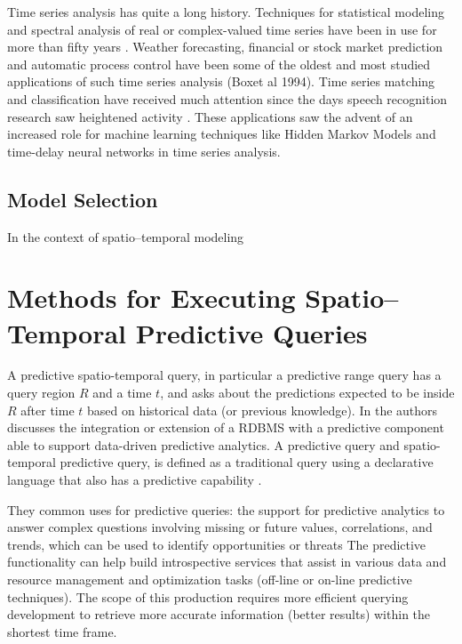 Time series analysis has quite a long history. Techniques for statistical modeling and spectral analysis of real or complex-valued time series have been in use for more than fifty years \cite{Box1976, Hyndman2006, Chatfield2019}. Weather forecasting, financial or stock market prediction and automatic process control have been some of the oldest and most studied applications of such time series analysis (Boxet al 1994). Time series matching and classification have received much attention since the days speech recognition research saw heightened activity \cite{}. These applications saw the advent of an increased role for machine learning techniques like Hidden Markov Models and time-delay neural networks in time series analysis.

\subsection{Model Selection}
\label{Sec:STModelSelection}

In the context of spatio--temporal modeling 

\section{Methods for Executing Spatio--Temporal Predictive Queries}
\label{Sec:RelatedWorksQueries}

A predictive spatio-temporal query, in particular a predictive range query has a query region $R$ and a time $t$, and asks about the predictions expected to be inside $R$ after time $t$ based on historical data (or previous knowledge).  In \cite{Akdere2011} the authors discusses the integration or extension of a RDBMS with a predictive component able to support data-driven predictive analytics. A predictive query and spatio-temporal predictive query, is defined as a traditional query using a declarative language that also has a predictive capability \cite{Hendawi2012}. 

They common uses for predictive queries: the support for predictive analytics to answer complex questions involving missing or future values, correlations, and trends, which  can be used to identify opportunities or threats
The predictive functionality can help build introspective services that assist in various data and resource management and optimization tasks (off-line or on-line predictive techniques). 
The  scope  of  this  production requires  more  efficient  querying development to  retrieve more accurate  information (better results)  within  the  shortest time  frame.


